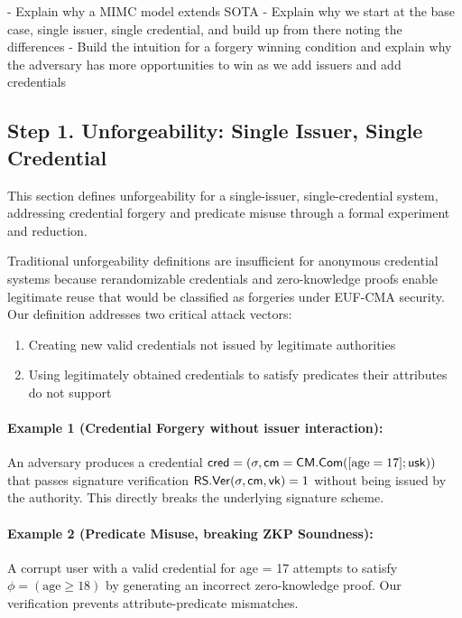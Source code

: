 

- Explain why a MIMC model extends SOTA
- Explain why we start at the base case, single issuer, single credential, and build up from there noting the differences
- Build the intuition for a forgery winning condition and explain why the adversary has more opportunities to win as we add issuers and add credentials



\subsection{Step 1. Unforgeability: Single Issuer, Single Credential}
This section defines unforgeability for a single-issuer, single-credential system, addressing credential forgery and predicate misuse through a formal experiment and reduction.

Traditional unforgeability definitions are insufficient for anonymous credential systems because rerandomizable credentials and zero-knowledge proofs enable legitimate reuse that would be classified as forgeries under EUF-CMA security. Our definition addresses two critical attack vectors:
\begin{enumerate}
\item Creating new valid credentials not issued by legitimate authorities
\item Using legitimately obtained credentials to satisfy predicates their attributes do not support
\end{enumerate}

\paragraph{Example 1 (Credential Forgery without issuer interaction):} An adversary produces a credential $\mathsf{cred} = (\sigma, \mathsf{cm} = \mathsf{CM.Com}([\text{age}=17];\mathsf{usk}))$  that passes signature verification $\mathsf{RS.Ver}(\sigma,\mathsf{cm},\mathsf{vk})=1$ without being issued by the authority. This directly breaks the underlying signature scheme.

\paragraph{Example 2 (Predicate Misuse, breaking ZKP Soundness):} A corrupt user with a valid credential for age = 17
attempts to satisfy $\phi=(\text{age} \geq 18)$ by generating an incorrect zero-knowledge proof. Our verification prevents attribute-predicate mismatches.

